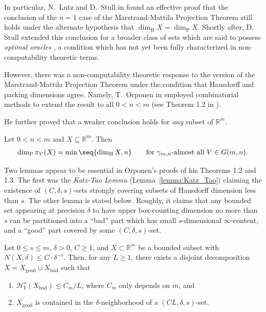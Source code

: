In particular, N.~Lutz and D.~Stull in \cite{LS17} found an effective proof that the conclusion of the $n = 1$ case of the Marstrand-Mattila Projection Theorem still holds under the alternate hypothesis that $\dim_{\operatorname{H}} X = \dim_{\operatorname{P}} X$. Shortly after, D. Stull extended this conclusion for a broader class of sets which are said to possess \textit{optimal oracles} \cite{Stu21}, a condition which has not yet been fully characterized in non-computability theoretic terms. 

However, there was a non-computability theoretic response to the version of the Marstrand-Mattila Projection Theorem under the condition that Hausdorff and packing dimensions agree. Namely, T.~Orponen in \cite{Orp21} employed combinatorial methods to extend the result to all $0 < n < m$ (see Theorem 1.2 in \cite{Orp21}). 

He further proved that a weaker conclusion holds for \textit{any} subset of $\mathbb{R}^m$.
\begin{theorem}
    \label{theorem:Orponen_weak_Marstrand}
    Let $0 < n < m$ and $X \subseteq \mathbb{R}^m$. Then 
    \begin{align*}
        \dim_{\operatorname{P}} \pi_V(X) = \min \seq{\dim_{\operatorname{H}} X, n} \qquad \text{for $\gamma_{m, n}$-almost all $V \in G(m, n)$}.
    \end{align*}
\end{theorem}

Two lemmas appear to be essential in Orponen's proofs of his Theorems 1.2 and 1.3. The first was the \textit{Katz-Tao Lemma} (Lemma~\ref{lemma:Katz_Tao}) claiming the existence of $(C, \delta, s)$-sets strongly covering subsets of Hausdorff dimension less than $s$. The other lemma is stated below. Roughly, it claims that any bounded set appearing at precision $\delta$ to have upper box-counting dimension no more than $s$ can be partitioned into a ``bad'' part which has small $s$-dimensional $\infty$-content, and a ``good'' part covered by some $(C, \delta, s)$-set. 

\begin{lemma}
    \label{lemma:Lemma_2.3_of_Orponen}
    Let $0 \leq s \leq m$, $\delta > 0$, $C \geq 1$, and $X \subset \mathbb{R}^m$ be a bounded subset with $N(X, \delta) \leq C \cdot \delta^{-s}$. Then, for any $L \geq 1$, there exists a disjoint decomposition $X = X_{\operatorname{good}} \sqcup X_{\operatorname{bad}}$ such that
    \begin{enumerate}[label = (\roman*)]
        \item $\mathcal{H}^s_{\operatorname{I}}(X_{\operatorname{bad}}) \leq C_m / L$, where $C_m$ only depends on $m$, and
        \item $X_{\operatorname{good}}$ is contained in the $\delta$-neighborhood of a $(CL, \delta, s)$-set.
    \end{enumerate}
\end{lemma}

